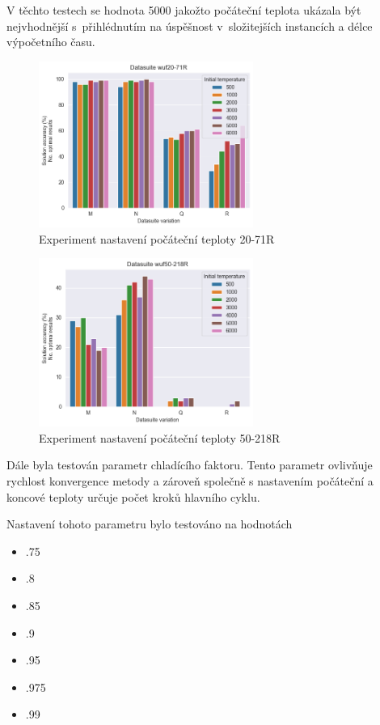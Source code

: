 \documentclass[twoside,twocolumn]{article}
\begin{document}
    V těchto testech se hodnota 5000 jakožto počáteční teplota ukázala být nejvhodnější s~přihlédnutím na úspěšnost
    v~složitejších instancích a délce výpočetního času.

    \begin{figure}
        \centering
        \includegraphics[width=7cm]{images/testing/initial_temperature/static_penalty_m5000/wuf20-71R}
        \caption{Experiment nastavení počáteční teploty 20-71R}
        \label{fig:initial_temperature_71}
    \end{figure}

    \begin{figure}
        \centering
        \includegraphics[width=7cm]{images/testing/initial_temperature/static_penalty_m5000/wuf50-218R}
        \caption{Experiment nastavení počáteční teploty 50-218R}
        \label{fig:initial_temperature_218R}
    \end{figure}

    Dále byla testován parametr chladícího faktoru.
    Tento parametr ovlivňuje rychlost konvergence metody a zároveň společně s nastavením počáteční a koncové teploty
    určuje počet kroků hlavního cyklu.

    Nastavení tohoto parametru bylo testováno na hodnotách

    \begin{itemize}
        \item .75
        \item .8
        \item .85
        \item .9
        \item .95
        \item .975
        \item .99
    \end{itemize}
\end{document}
